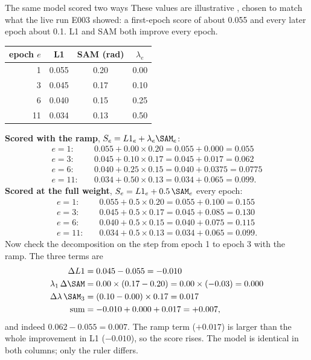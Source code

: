 \begin{worked}[label={we:pretrain:ramp}]{The same model scored two ways}
These values are illustrative \tagA, chosen to match what the live run E003 showed: a first-epoch score of about
0.055 and every later epoch about 0.1. L1 and SAM both improve every epoch.
\begin{center}
\begin{tabular}{rccc}
\toprule
epoch $e$ & L1 & SAM (rad) & $\lambda_e$\\
\midrule
1 & 0.055 & 0.20 & 0.00\\
3 & 0.045 & 0.17 & 0.10\\
6 & 0.040 & 0.15 & 0.25\\
11 & 0.034 & 0.13 & 0.50\\
\bottomrule
\end{tabular}
\end{center}
\textbf{Scored with the ramp}, $S_e = L1_e + \lambda_e\SAM_e$:
\begin{align*}
  e = 1:&\quad 0.055 + 0.00 \times 0.20 = 0.055 + 0.000 = 0.055\\
  e = 3:&\quad 0.045 + 0.10 \times 0.17 = 0.045 + 0.017 = 0.062\\
  e = 6:&\quad 0.040 + 0.25 \times 0.15 = 0.040 + 0.0375 = 0.0775\\
  e = 11:&\quad 0.034 + 0.50 \times 0.13 = 0.034 + 0.065 = 0.099.
\end{align*}
\textbf{Scored at the full weight}, $S_e = L1_e + 0.5\,\SAM_e$ every epoch:
\begin{align*}
  e = 1:&\quad 0.055 + 0.5 \times 0.20 = 0.055 + 0.100 = 0.155\\
  e = 3:&\quad 0.045 + 0.5 \times 0.17 = 0.045 + 0.085 = 0.130\\
  e = 6:&\quad 0.040 + 0.5 \times 0.15 = 0.040 + 0.075 = 0.115\\
  e = 11:&\quad 0.034 + 0.5 \times 0.13 = 0.034 + 0.065 = 0.099.
\end{align*}
Now check the decomposition on the step from epoch 1 to epoch 3 with the ramp. The three terms are
\begin{align*}
  \Delta L1 &= 0.045 - 0.055 = -0.010\\
  \lambda_1\,\Delta\SAM &= 0.00 \times (0.17 - 0.20) = 0.00 \times (-0.03) = 0.000\\
  \Delta\lambda\,\SAM_3 &= (0.10 - 0.00) \times 0.17 = 0.017\\
  \text{sum} &= -0.010 + 0.000 + 0.017 = +0.007,
\end{align*}
and indeed $0.062 - 0.055 = 0.007$. The ramp term ($+0.017$) is larger than the whole improvement in L1
($-0.010$), so the score rises. The model is identical in both columns; only the ruler differs.
\end{worked}

